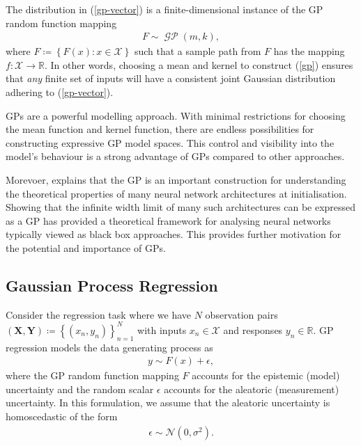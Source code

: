 \documentclass{article}
\newcommand{\GP}{\operatorname{\mathcal{GP}}}
\numberwithin{equation}{section}
\begin{document}
The distribution in (\ref{gp-vector}) is a finite-dimensional instance of the GP random function mapping
\begin{align}
    F \sim \GP(m, k),
    \label{gp}
\end{align}
 where $F \coloneqq \left\{F(x): x \in \mathcal{X}\right\}$ such that a sample path from $F$ has the mapping $f: \mathcal{X} \rightarrow \mathbb{R}$.
In other words, choosing a mean and kernel to construct (\ref{gp}) ensures that \textit{any} finite set of inputs will have a consistent joint Gaussian distribution adhering to (\ref{gp-vector}).

GPs are a powerful modelling approach. With minimal restrictions for choosing the mean function and kernel function, there are endless possibilities for constructing expressive GP model spaces.
This control and visibility into the model's behaviour is a strong advantage of GPs compared to other approaches.

Morevoer, \cite{novak2019neural} explains that the GP is an important construction for understanding the theoretical properties of many neural network architectures at initialisation.
Showing that the infinite width limit of many such architectures can be expressed as a GP has provided a theoretical framework for analysing neural networks typically viewed as black box approaches.
This provides further motivation for the potential and importance of GPs.

\subsection{Gaussian Process Regression}
Consider the regression task where we have $N$ observation pairs $(\mathbf{X}, \mathbf{Y}) \coloneqq \left\{(x_n, y_n)\right\}_{n=1}^{N}$ with inputs $x_n \in \mathcal{X}$ and responses $y_n \in \mathbb{R}$. GP regression models the data generating process as
\begin{align}
    y \sim F(x) + \epsilon,
    \label{regression-data-uncertainties}
\end{align}
where the GP random function mapping $F$ accounts for the epistemic (model) uncertainty and the random scalar $\epsilon$ accounts for the aleatoric (measurement) uncertainty. In this formulation, we assume that the aleatoric uncertainty is homoscedastic of the form
\begin{align}
    \epsilon \sim \mathcal{N} \left(0, \sigma^2\right).
    \label{aleotric-uncertainty}
\end{align}
\end{document}
